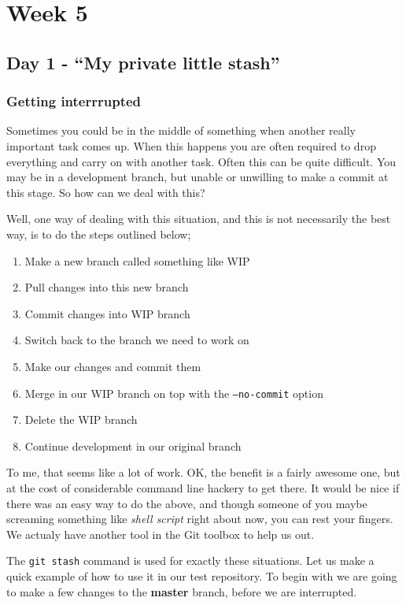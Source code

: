 \cleardoublepage
\chapter{Week 5}

\section{Day 1 - ``My private little stash''}
\subsection{Getting interrrupted}

Sometimes you could be in the middle of something when another really important task comes up.  When this happens you are often required to drop everything and carry on with another task.  Often this can be quite difficult.  You may be in a development branch, but unable or unwilling to make a commit at this stage.  So how can we deal with this?

Well, one way of dealing with this situation, and this is not necessarily the best way, is to do the steps outlined below;

\begin{enumerate}
\item Make a new branch called something like WIP
\item Pull changes into this new branch
\item Commit changes into WIP branch
\item Switch back to the branch we need to work on
\item Make our changes and commit them
\item Merge in our WIP branch on top with the \texttt{--no-commit} option
\item Delete the WIP branch
\item Continue development in our original branch
\end{enumerate}

To me, that seems like a lot of work.  OK, the benefit is a fairly awesome one, but at the cost of considerable command line hackery to get there.  It would be nice if there was an easy way to do the above, and though someone of you maybe screaming something like \emph{shell script} right about now, you can rest your fingers.  We actualy have another tool in the Git toolbox to help us out.

The \texttt{git stash} command is used for exactly these situations.  Let us make a quick example of how to use it in our test repository.  To begin with we are going to make a few changes to the \textbf{master} branch, before we are interrupted.

